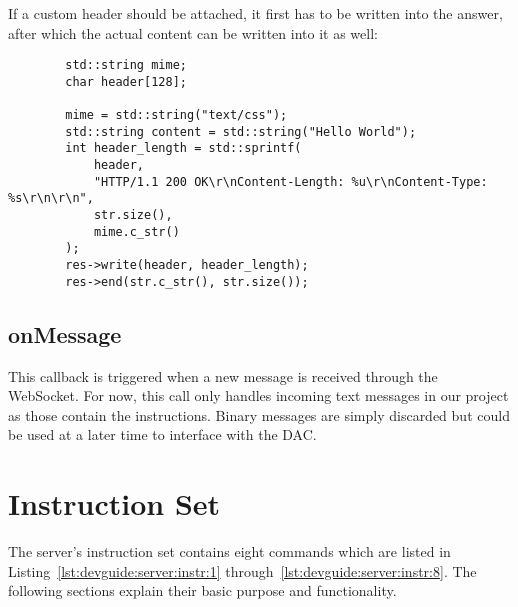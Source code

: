 If a  custom header should be  attached, it first  has to be written  into the
answer, after which the actual content can be written into it as well:
\begin{tcolorbox}[skin=alpenlisting]
    \begin{verbatim}
        std::string mime;
        char header[128];

        mime = std::string("text/css");
        std::string content = std::string("Hello World");
        int header_length = std::sprintf(
            header,
            "HTTP/1.1 200 OK\r\nContent-Length: %u\r\nContent-Type: %s\r\n\r\n",
            str.size(),
            mime.c_str()
        );
        res->write(header, header_length);
        res->end(str.c_str(), str.size());
    \end{verbatim}
\end{tcolorbox}



\subsection{onMessage} %
\label{subsec:devguide:server:onmessage}

This  callback  is triggered  when  a  new  message  is received  through  the
WebSocket.  For  now, this  call only  handles incoming  text messages  in our
project  as  those  contain  the instructions.   Binary  messages  are  simply
discarded but could be used at a later time to interface with the DAC.

\section{Instruction Set} %
\label{sec:devguide:server:instruction}

The     server's      instruction     set     contains      eight     commands
which     are      listed     in     Listing~\ref{lst:devguide:server:instr:1}
through~\ref{lst:devguide:server:instr:8}. The   following  sections   explain
their basic purpose and functionality.

